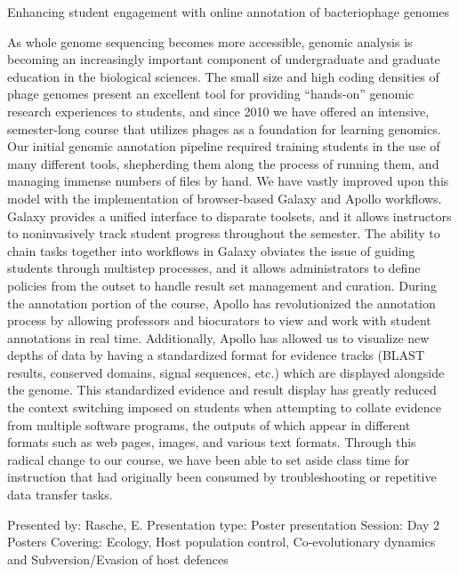 Enhancing student engagement with online annotation of bacteriophage genomes

As whole genome sequencing becomes more accessible, genomic analysis is
becoming an increasingly important component of undergraduate and graduate
education in the biological sciences. The small size and high coding
densities of phage genomes present an excellent tool for providing
“hands-on” genomic research experiences to students, and since 2010 we
have offered an intensive, semester-long course that utilizes phages as a
foundation for learning genomics. Our initial genomic annotation pipeline
required training students in the use of many different tools, shepherding
them along the process of running them, and managing immense numbers of
files by hand. We have vastly improved upon this model with the
implementation of browser-based Galaxy and Apollo workflows. Galaxy
provides a unified interface to disparate toolsets, and it allows
instructors to noninvasively track student progress throughout the
semester. The ability to chain tasks together into workflows in Galaxy
obviates the issue of guiding students through multistep processes, and it
allows administrators to define policies from the outset to handle result
set management and curation. During the annotation portion of the course,
Apollo has revolutionized the annotation process by allowing professors
and biocurators to view and work with student annotations in real time.
Additionally, Apollo has allowed us to visualize new depths of data by
having a standardized format for evidence tracks (BLAST results, conserved
domains, signal sequences, etc.) which are displayed alongside the genome.
This standardized evidence and result display has greatly reduced the
context switching imposed on students when attempting to collate evidence
from multiple software programs, the outputs of which appear in different
formats such as web pages, images, and various text formats. Through this
radical change to our course, we have been able to set aside class time
for instruction that had originally been consumed by troubleshooting or
repetitive data transfer tasks.

Presented by: Rasche, E.
Presentation type: Poster presentation
Session: Day 2 Posters Covering: Ecology, Host population control, Co-evolutionary dynamics and Subversion/Evasion of host defences
